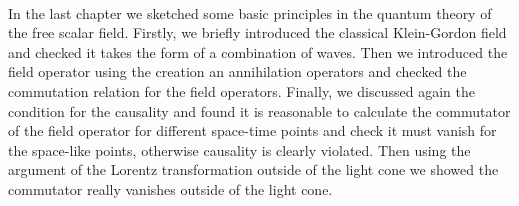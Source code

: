 \paragraph{} In the last chapter we sketched some basic principles in the quantum theory of the free scalar field.
Firstly, we briefly introduced the classical Klein-Gordon field and checked it takes the form of a combination
of waves. Then we introduced the field operator using the creation an annihilation operators and checked the
commutation relation for the field operators. Finally, we discussed again the condition for the causality
and found it is reasonable to calculate the commutator of the field operator for different space-time points
and check it must vanish for the space-like points, otherwise causality is clearly violated. Then using the argument 
of the Lorentz transformation outside of the light cone we showed the commutator really vanishes outside of the light 
cone.
